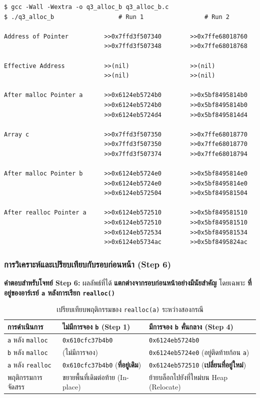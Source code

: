 \documentclass[a4paper,11pt]{article}
\newcommand{\code}[1]{\texttt{#1}}
\begin{document}
\begin{lstlisting}[style=terminal,caption={ผลการทดลอง Step 4--5 (รัน 2 ครั้งหลังเปิดคอมเมนต์)}]
$ gcc -Wall -Wextra -o q3_alloc_b q3_alloc_b.c
$ ./q3_alloc_b                  # Run 1                 # Run 2

Address of Pointer          >>0x7ffd3f507340        >>0x7ffe68018760
                            >>0x7ffd3f507348        >>0x7ffe68018768

Effective Address           >>(nil)                 >>(nil)
                            >>(nil)                 >>(nil)

After malloc Pointer a      >>0x6124eb5724b0        >>0x5bf8495814b0
                            >>0x6124eb5724b0        >>0x5bf8495814b0
                            >>0x6124eb5724d4        >>0x5bf8495814d4

Array c                     >>0x7ffd3f507350        >>0x7ffe68018770
                            >>0x7ffd3f507350        >>0x7ffe68018770
                            >>0x7ffd3f507374        >>0x7ffe68018794

After malloc Pointer b      >>0x6124eb5724e0        >>0x5bf8495814e0
                            >>0x6124eb5724e0        >>0x5bf8495814e0
                            >>0x6124eb572504        >>0x5bf849581504

After realloc Pointer a     >>0x6124eb572510        >>0x5bf849581510
                            >>0x6124eb572510        >>0x5bf849581510
                            >>0x6124eb572534        >>0x5bf849581534
                            >>0x6124eb5734ac        >>0x5bf8495824ac
\end{lstlisting}

\subsubsection{การวิเคราะห์และเปรียบเทียบกับรอบก่อนหน้า (Step 6)}

\textbf{คำตอบสำหรับโจทย์ Step 6:} ผลลัพธ์ที่ได้ \textbf{แตกต่างจากรอบก่อนหน้าอย่างมีนัยสำคัญ} โดยเฉพาะ \textbf{ที่อยู่ของอาร์เรย์ \code{a} หลังการเรียก \code{realloc()}}

\begin{table}[H]
\centering\small
\caption{เปรียบเทียบพฤติกรรมของ \code{realloc(a)} ระหว่างสองกรณี}
\begin{tabular}{p{3.5cm}p{5.2cm}p{5.2cm}}
\toprule
\textbf{การดำเนินการ} & \textbf{ไม่มีการจอง \code{b} (Step 1)} & \textbf{มีการจอง \code{b} คั่นกลาง (Step 4)} \\
\midrule
\code{a} หลัง \code{malloc} & \code{0x610cfc37b4b0} & \code{0x6124eb5724b0} \\
\code{b} หลัง \code{malloc} & (ไม่มีการจอง) & \code{0x6124eb5724e0} (อยู่ติดท้ายก้อน \code{a}) \\
\code{a} หลัง \code{realloc} & \code{0x610cfc37b4b0} (\textbf{ที่อยู่เดิม}) & \code{0x6124eb572510} (\textbf{เปลี่ยนที่อยู่ใหม่}) \\
พฤติกรรมการจัดสรร & ขยายพื้นที่เดิมต่อท้าย (In-place) & ย้ายบล็อกไปยังที่ใหม่บน Heap (Relocate) \\
\bottomrule
\end{tabular}
\end{table}
\end{document}

